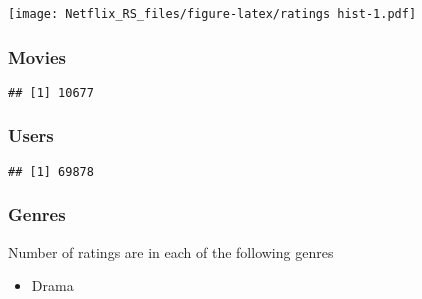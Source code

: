 \documentclass[
]{article}
\newenvironment{Shaded}{\begin{snugshade}}{\end{snugshade}}
\newcommand{\KeywordTok}[1]{\textcolor[rgb]{0.13,0.29,0.53}{\textbf{#1}}}
\newcommand{\NormalTok}[1]{#1}
\newcommand{\OperatorTok}[1]{\textcolor[rgb]{0.81,0.36,0.00}{\textbf{#1}}}
\newcommand{\StringTok}[1]{\textcolor[rgb]{0.31,0.60,0.02}{#1}}
\providecommand{\tightlist}{%
  \setlength{\itemsep}{0pt}\setlength{\parskip}{0pt}}
\begin{document}
\texttt{[image: Netflix\_RS\_files/figure-latex/ratings hist-1.pdf]}

\hypertarget{movies}{%
\subsubsection{Movies}\label{movies}}

\begin{Shaded}
\end{Shaded}

\begin{verbatim}
## [1] 10677
\end{verbatim}

\hypertarget{users}{%
\subsubsection{Users}\label{users}}

\begin{Shaded}
\end{Shaded}

\begin{verbatim}
## [1] 69878
\end{verbatim}

\hypertarget{genres}{%
\subsubsection{Genres}\label{genres}}

Number of ratings are in each of the following genres

\begin{itemize}
\tightlist
\item
  Drama
\end{itemize}

\begin{Shaded}
\end{Shaded}
\end{document}
